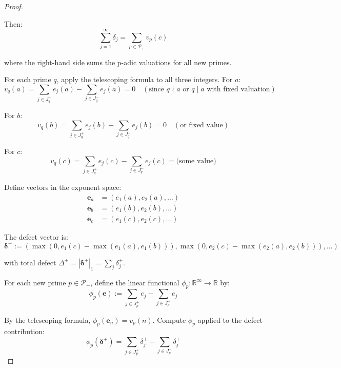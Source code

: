 \begin{proof}
\begin{lemma}
Then:
\begin{equation}
\sum_{j=1}^{\infty} \delta_j = \sum_{p \in \mathcal{P}_+} v_p(c)
\end{equation}

where the right-hand side sums the p-adic valuations for all new primes.

\end{lemma}

For each prime $q$, apply the telescoping formula to all three integers. For $a$:
\begin{equation}
v_q(a) = \sum_{j \in J_q^+} e_j(a) - \sum_{j \in J_q^-} e_j(a) = 0 \quad (\text{since } q \nmid a \text{ or } q \mid a \text{ with fixed valuation})
\end{equation}

For $b$:
\begin{equation}
v_q(b) = \sum_{j \in J_q^+} e_j(b) - \sum_{j \in J_q^-} e_j(b) = 0 \quad (\text{or fixed value})
\end{equation}

For $c$:
\begin{equation}
v_q(c) = \sum_{j \in J_q^+} e_j(c) - \sum_{j \in J_q^-} e_j(c) = \text{(some value)}
\end{equation}

Define vectors in the exponent space:
\begin{align}
\mathbf{e}_a &= (e_1(a), e_2(a), \ldots) \\
\mathbf{e}_b &= (e_1(b), e_2(b), \ldots) \\
\mathbf{e}_c &= (e_1(c), e_2(c), \ldots)
\end{align}

The defect vector is:
\begin{equation}
\boldsymbol{\delta}^+ := (\max(0, e_1(c) - \max(e_1(a), e_1(b))), \max(0, e_2(c) - \max(e_2(a), e_2(b))), \ldots)
\end{equation}

with total defect $\Delta^+ = |\boldsymbol{\delta}^+|_1 = \sum_j \delta_j^+$.

For each new prime $p \in \mathcal{P}_+$, define the linear functional $\phi_p: \mathbb{R}^{\infty} \to \mathbb{R}$ by:
\begin{equation}
\phi_p(\mathbf{e}) := \sum_{j \in J_p^+} e_j - \sum_{j \in J_p^-} e_j
\end{equation}

By the telescoping formula, $\phi_p(\mathbf{e}_n) = v_p(n)$. Compute $\phi_p$ applied to the defect contribution:
\begin{equation}
\phi_p(\boldsymbol{\delta}^+) = \sum_{j \in J_p^+} \delta_j^+ - \sum_{j \in J_p^-} \delta_j^+
\end{equation}


\end{proof}

